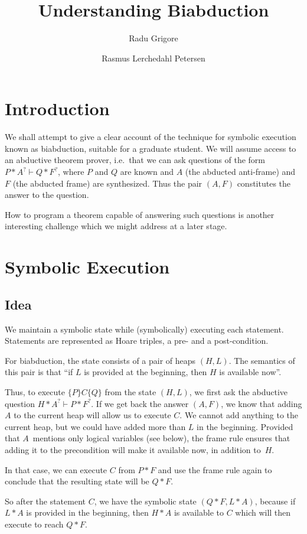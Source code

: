 \documentclass{article}
\title{Understanding Biabduction}
\author{Radu Grigore \and Rasmus Lerchedahl Petersen}
\newcommand{\hoare}[3]{\{#1\}#2\{#3\}}
\newcommand{\ts}{\vdash} %
\begin{document}
\maketitle
\section{Introduction}\label{sec:intro}
We shall attempt to give a clear account of the technique for symbolic
execution known as biabduction, suitable for a graduate student. We
will assume access to an abductive theorem prover, i.e.~that we can
ask questions of the form $P * A^? \ts Q * F^?$, where $P$ and $Q$ are
known and $A$ (the abducted anti-frame) and $F$ (the abducted frame)
are synthesized. Thus the pair $(A, F)$ constitutes the answer to the
question.

How to program a theorem capable of answering such questions is
another interesting challenge which we might address at a later stage.
\section{Symbolic Execution}\label{sec:symbexe}
\subsection{Idea}\label{sec:symbexe:idea}
We maintain a symbolic state while (symbolically) executing each
statement. Statements are represented as Hoare triples, a pre- and a
post-condition.

For biabduction, the state consists of a pair of heaps $(H, L)$. The
semantics of this pair is that ``if $L$ is provided at the beginning,
then $H$ is available now''.

Thus, to execute $\hoare P C Q$ from the state $(H, L)$, we first
ask the abductive question $H * A^? \ts P * F^?$. If we get back
the answer $(A, F)$, we know that adding $A$ to the current heap
will allow us to execute $C$. We cannot add anything to the
current heap, but we could have added more than $L$ in the
beginning.  Provided that $A$~mentions only logical variables
(see below), the frame rule ensures that adding it to the
precondition will make it available now, in addition to~$H$.

In that case, we can execute $C$ from $P * F$ and use the frame rule
again to conclude that the resulting state will be $Q * F$.

So after the statement $C$, we have the symbolic state $(Q * F, L *
A)$, because if $L * A$ is provided in the beginning, then $H * A$ is
available to $C$ which will then execute to reach $Q * F$.
\end{document}
